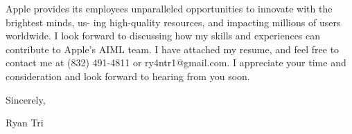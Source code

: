 \documentclass{ExpressiveCoverLetter}
\begin{document}
Apple provides its employees unparalleled opportunities to innovate with the brightest minds, us- ing high-quality resources, and impacting millions of users worldwide. I look forward to discussing how my skills and experiences can contribute to Apple’s AIML team. I have attached my resume, and feel free to contact me at (832) 491-4811 or ry4ntr1@gmail.com. I appreciate your time and consideration and look forward to hearing from you soon.\newline

Sincerely, \newline

Ryan Tri \newline
\end{document}
